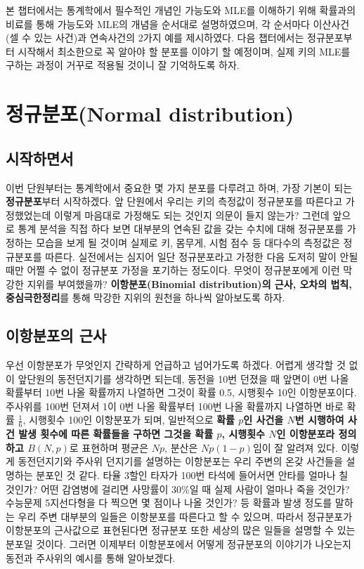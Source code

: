 \documentclass[]{book}
\begin{document}
본 챕터에서는 통계학에서 필수적인 개념인 가능도와 MLE를 이해하기 위해
확률과의 비료를 통해 가능도와 MLE의 개념을 순서대로 설명하였으며, 각
순서마다 이산사건(셀 수 있는 사건)과 연속사건의 2가지 예를 제시하였다.
다음 챕터에서는 정규분포부터 시작해서 최소한으로 꼭 알아야 할 분포를
이야기 할 예정이며, 실제 키의 MLE를 구하는 과정이 거꾸로 적용될 것이니
잘 기억하도록 하자.

\chapter{정규분포(Normal
distribution)}\label{uxc815uxaddcuxbd84uxd3ecnormal-distribution}

\section{시작하면서}\label{uxc2dcuxc791uxd558uxba74uxc11c-1}

이번 단원부터는 통계학에서 중요한 몇 가지 분포를 다루려고 하며, 가장
기본이 되는 \textbf{정규분포}부터 시작하겠다. 앞 단원에서 우리는 키의
측정값이 정규분포를 따른다고 가정했었는데 이렇게 마음대로 가정해도 되는
것인지 의문이 들지 않는가? 그런데 앞으로 통계 분석을 직접 하다 보면
대부분의 연속된 값을 갖는 수치에 대해 정규분포를 가정하는 모습을 보게 될
것이며 실제로 키, 몸무게, 시험 점수 등 대다수의 측정값은 정규분포를
따른다. 실전에서는 심지어 일단 정규분포라고 가정한 다음 도저히 말이 안될
때만 어쩔 수 없이 정규분포 가정을 포기하는 정도이다. 무엇이 정규분포에게
이런 막강한 지위를 부여했을까? \textbf{이항분포(Binomial distribution)의
근사, 오차의 법칙, 중심극한정리}를 통해 막강한 지위의 원천을 하나씩
알아보도록 하자.

\section{이항분포의
근사}\label{uxc774uxd56duxbd84uxd3ecuxc758-uxadfcuxc0ac}

우선 이항분포가 무엇인지 간략하게 언급하고 넘어가도록 하겠다. 어렵게
생각할 것 없이 앞단원의 동전던지기를 생각하면 되는데, 동전을 10번 던졌을
때 앞면이 0번 나올 확률부터 10번 나올 확률까지 나열하면 그것이 확률 0.5,
시행횟수 10인 이항분포이다. 주사위를 100번 던져서 1이 0번 나올 확률부터
100번 나올 확률까지 나열하면 바로 확률 \(\frac{1}{6}\), 시행횟수 100인
이항분포가 되며, 일반적으로 \textbf{확률 \(p\)인 사건을 \(N\)번 시행하여
사건 발생 횟수에 따른 확률들을 구하면 그것을 확률 \(p\), 시행횟수
\(N\)인 이항분포라 정의하고 \(B(N,p)\)}로 표현하며 평균은 \(Np\), 분산은
\(Np(1-p)\)임이 잘 알려져 있다. 이렇게 동전던지기와 주사위 던지기를
설명하는 이항분포는 우리 주변의 온갖 사건들을 설명하는 분포인 것 같다.
타율 3할인 타자가 100번 타석에 들어서면 안타를 얼마나 칠 것인가? 어떤
감염병에 걸리면 사망률이 30\%일 때 실제 사람이 얼마나 죽을 것인가?
수능문제 5지선다형을 다 찍으면 몇 점이나 나올 것인가? 등 확률과 발생
정도를 말하는 우리 주변 대부분의 일들은 이항분포를 따른다고 할 수
있으며, 따라서 정규분포가 이항분포의 근사값으로 표현된다면 정규분포 또한
세상의 많은 일들을 설명할 수 있는 분포일 것이다. 그러면 이제부터
이항분포에서 어떻게 정규분포의 이야기가 나오는지 동전과 주사위의 예시를
통해 알아보겠다.
\end{document}
